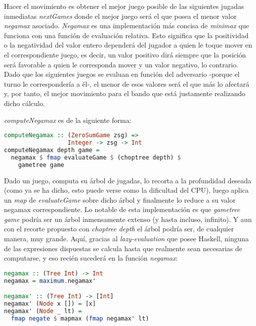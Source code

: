 \documentclass{llncs}
\begin{document}
Hacer el movimiento es obtener el mejor juego posible de las siguientes jugadas inmediatas \textit{nextGames} donde el mejor juego será el que posea el menor valor \textit{negamax} asociado. \textit{Negamax} es una implementación más concisa de \textit{minimax} que funciona con una función de evaluación relativa. Esto significa que la positividad o la negatividad del valor entero dependerá del jugador a quien le toque mover en el correspondiente juego, es decir, un valor positivo dirá siempre que la posición será favorable a quien le corresponda mover y un valor negativo, lo contrario. Dado que los siguientes juegos se evaluan en función del adversario -porque el turno le correspondería a él-, el menor de esos valores será el que más lo afectará y, por tanto, el mejor movimiento para el bando que está justamente realizando dicho cálculo.

\textit{computeNegamax} es de la siguiente forma:

\begin{lstlisting}[frame=single, language=haskell, captionpos=b, caption=Definición de computeNegamax, label={lst:compute_negamax}]
computeNegamax :: (ZeroSumGame zsg) =>
                  Integer -> zsg -> Int
computeNegamax depth game =
  negamax $ fmap evaluateGame $ (choptree depth) $
    gametree game
\end{lstlisting}

Dado un juego, computa su árbol de jugadas, lo recorta a la profundidad deseada (como ya se ha dicho, esto puede verse como la dificultad del CPU), luego aplica un \textit{map} de \textit{evaluateGame} sobre dicho árbol y finalmente lo reduce a su valor negamax correspondiente. Lo notable de esta implementación es que \textit{gametree game} podría ser un árbol inmensamente extenso (y hasta incluso, infinito). Y aun con el recorte propuesto con \textit{choptree depth} el árbol podría ser, de cualquier manera, muy grande. Aquí, gracias al \textit{lazy-evaluation} que posee Haskell, ninguna de las expresiones dispuestas se calcula hasta que realmente sean necesarias de computarse, y eso recién sucederá en la función \textit{negamax}:

\begin{lstlisting}[frame=single, language=haskell, captionpos=b, caption=Definiciones de negamax]
negamax :: (Tree Int) -> Int
negamax = maximum.negamax'

negamax' :: (Tree Int) -> [Int]
negamax' (Node x []) = [x]
negamax' (Node _ lt) =
  fmap negate $ mapmax (fmap negamax' lt)
\end{lstlisting}
\end{document}
